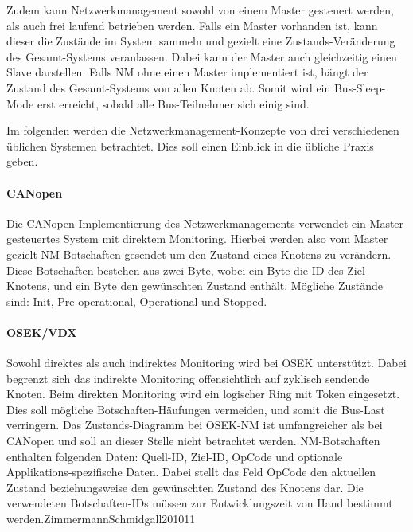 \documentclass[
  a4paper,					    %
  twoside,
  DIV=calc,     				%
  bibliography=totoc,
  cleardoublepage=empty,
  ngerman,     					%
  final       					%
]{scrbook}
\begin{document}
Zudem kann Netzwerkmanagement sowohl von einem Master gesteuert werden, als auch frei laufend betrieben werden. Falls ein Master vorhanden ist, kann dieser die Zustände im System sammeln und gezielt eine Zu\-stands-Ver\-än\-de\-rung des Gesamt-Systems veranlassen. Dabei kann der Master auch gleichzeitig einen Slave darstellen. Falls NM ohne einen Master implementiert ist, hängt der Zustand des Gesamt-Systems von allen Knoten ab. Somit wird ein Bus-Sleep-Mode erst erreicht, sobald alle Bus-Teilnehmer sich einig sind.

Im folgenden werden die Netzwerkmanagement-Konzepte von drei verschiedenen üblichen Systemen betrachtet. Dies soll einen Einblick in die übliche Praxis geben.

\paragraph{CANopen}
Die CANopen-Implementierung des Netzwerkmanagements verwendet ein Master-gesteuertes System mit direktem Monitoring. Hierbei werden also vom Master gezielt NM-Botschaften gesendet um den Zustand eines Knotens zu verändern. Diese Botschaften bestehen aus zwei Byte, wobei ein Byte die ID des Ziel-Knotens, und ein Byte den gewünschten Zustand enthält. Mögliche Zustände sind: Init, Pre-operational, Operational und Stopped.\cite{nm_canopen}\cite{wiki:canopen}

\paragraph{OSEK/VDX}
Sowohl direktes als auch indirektes Monitoring wird bei OSEK unterstützt. Dabei begrenzt sich das indirekte Monitoring offensichtlich auf zyklisch sendende Knoten. Beim direkten Monitoring wird ein logischer Ring mit Token eingesetzt. Dies soll mögliche Botschaften-Häufungen vermeiden, und somit die Bus-Last verringern. Das Zustands-Diagramm bei OSEK-NM ist umfangreicher als bei CANopen und soll an dieser Stelle nicht betrachtet werden. NM-Botschaften enthalten folgenden Daten: Quell-ID, Ziel-ID, OpCode und optionale Applikations-spezifische Daten. Dabei stellt das Feld OpCode den aktuellen Zustand beziehungsweise den gewünschten Zustand des Knotens dar. Die verwendeten Botschaften-IDs müssen zur Entwicklungszeit von Hand bestimmt werden.{ZimmermannSchmidgall201011}\cite{nm_osek}
\end{document}
